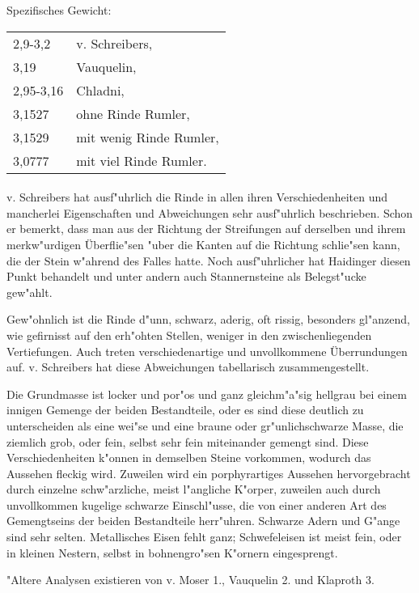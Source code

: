 \documentclass[a4paper, 11pt, oneside]{article}
\begin{document}
Spezifisches Gewicht:
\begin{table}[!ht]
    \centering
    \begin{tabular}{l l}
        2,9-3,2 & v. Schreibers,\\
        3,19 & Vauquelin,\\
        2,95-3,16 & Chladni,\\
        3,1527 & ohne Rinde Rumler,\\
        3,1529 & mit wenig Rinde Rumler,\\
        3,0777 & mit viel Rinde Rumler.
    \end{tabular}
\end{table}
\paragraph{}
v. Schreibers hat ausf"uhrlich die Rinde in allen ihren Verschiedenheiten und mancherlei Eigenschaften und Abweichungen sehr ausf"uhrlich beschrieben. Schon er bemerkt, dass man aus der Richtung der Streifungen auf derselben und ihrem merkw"urdigen Überflie"sen "uber die Kanten auf die Richtung schlie"sen kann, die der Stein w"ahrend des Falles hatte. Noch ausf"uhrlicher hat Haidinger diesen Punkt behandelt und unter andern auch Stannernsteine als Belegst"ucke gew"ahlt.

Gew"ohnlich ist die Rinde d"unn, schwarz, aderig, oft rissig, besonders gl"anzend, wie gefirnisst auf den erh"ohten Stellen, weniger in den zwischenliegenden Vertiefungen. Auch treten verschiedenartige und unvollkommene Überrundungen auf. v. Schreibers hat diese Abweichungen tabellarisch zusammengestellt.

Die Grundmasse ist locker und por"os und ganz gleichm"a"sig hellgrau bei einem innigen Gemenge der beiden Bestandteile, oder es sind diese deutlich zu unterscheiden als eine wei"se und eine braune oder gr"unlichschwarze Masse, die ziemlich grob, oder fein, selbst sehr fein miteinander gemengt sind. Diese Verschiedenheiten k"onnen in demselben Steine vorkommen, wodurch das Aussehen fleckig wird. Zuweilen wird ein porphyrartiges Aussehen hervorgebracht durch einzelne schw"arzliche, meist l"angliche K"orper, zuweilen auch durch unvollkommen kugelige schwarze Einschl"usse, die von einer anderen Art des Gemengtseins der beiden Bestandteile herr"uhren. Schwarze Adern und G"ange sind sehr selten. Metallisches Eisen fehlt ganz; Schwefeleisen ist meist fein, oder in kleinen Nestern, selbst in bohnengro"sen K"ornern eingesprengt.

"Altere Analysen existieren von v. Moser 1., Vauquelin 2. und Klaproth 3.
\end{document}
